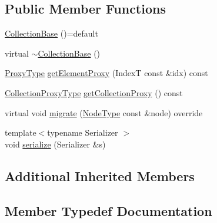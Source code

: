 \subsection*{Public Member Functions}
\begin{DoxyCompactItemize}
\item 
\hyperlink{structvt_1_1vrt_1_1collection_1_1_collection_base_ab2134eca144d6b2703fffb12c71d9f9b}{Collection\+Base} ()=default
\item 
virtual \hyperlink{structvt_1_1vrt_1_1collection_1_1_collection_base_aa343e5527cb05addb8bbb04994ebc23e}{$\sim$\+Collection\+Base} ()
\item 
\hyperlink{structvt_1_1vrt_1_1collection_1_1_collection_base_a0c2fd2443732bebc963f6278b7ba089b}{Proxy\+Type} \hyperlink{structvt_1_1vrt_1_1collection_1_1_collection_base_acf2b3173e77b083920e3d4a06728e4c6}{get\+Element\+Proxy} (IndexT const \&idx) const
\item 
\hyperlink{structvt_1_1vrt_1_1collection_1_1_collection_base_af40b40a2ee128748bcb917f14a0152b4}{Collection\+Proxy\+Type} \hyperlink{structvt_1_1vrt_1_1collection_1_1_collection_base_ad97d9ab1a28fb535c5d7f82c15e99791}{get\+Collection\+Proxy} () const
\item 
virtual void \hyperlink{structvt_1_1vrt_1_1collection_1_1_collection_base_a34f089d6f08e84b1745a265ad865807a}{migrate} (\hyperlink{namespacevt_a866da9d0efc19c0a1ce79e9e492f47e2}{Node\+Type} const \&node) override
\item 
{\footnotesize template$<$typename Serializer $>$ }\\void \hyperlink{structvt_1_1vrt_1_1collection_1_1_collection_base_a8f5dc077e523958ea8b7290b8a10846f}{serialize} (Serializer \&s)
\end{DoxyCompactItemize}
\subsection*{Additional Inherited Members}


\subsection{Member Typedef Documentation}
\mbox{\label{structvt_1_1vrt_1_1collection_1_1_collection_base_af40b40a2ee128748bcb917f14a0152b4}} 
